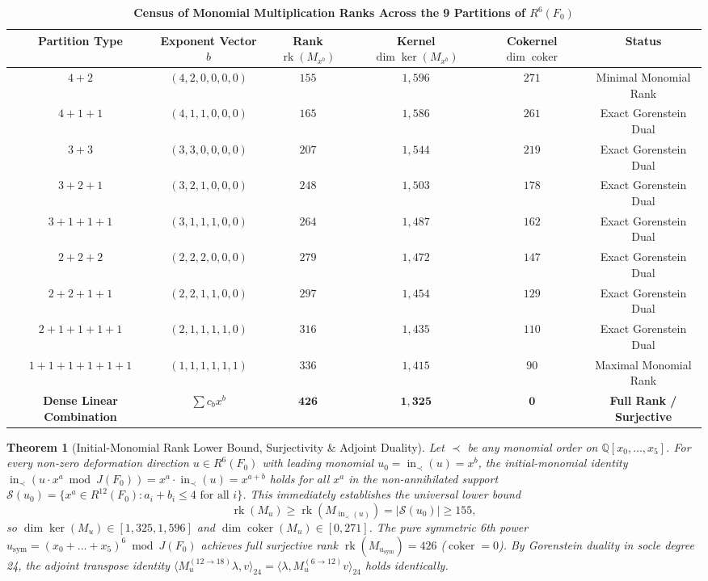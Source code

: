 \documentclass[11pt,a4paper]{article}
\newtheorem{theorem}{Theorem}[section]
\theoremstyle{definition}
\theoremstyle{remark}
\DeclareMathOperator{\rk}{rk}
\DeclareMathOperator{\coker}{coker}
\begin{document}
\begin{table}[htbp]
\centering
\small
\caption{\textbf{Census of Monomial Multiplication Ranks Across the 9 Partitions of $R^6(F_0)$}}
\label{tab:nine_partitions}
\begin{tabular}{cccccc}
\toprule
\textbf{Partition Type} & \textbf{Exponent Vector $b$} & \textbf{Rank $\rk(M_{x^b})$} & \textbf{Kernel $\dim\ker(M_{x^b})$} & \textbf{Cokernel $\dim\coker$} & \textbf{Status} \\
\midrule
$4+2$ & $(4, 2, 0, 0, 0, 0)$ & $155$ & $1,596$ & $271$ & Minimal Monomial Rank \\
$4+1+1$ & $(4, 1, 1, 0, 0, 0)$ & $165$ & $1,586$ & $261$ & Exact Gorenstein Dual \\
$3+3$ & $(3, 3, 0, 0, 0, 0)$ & $207$ & $1,544$ & $219$ & Exact Gorenstein Dual \\
$3+2+1$ & $(3, 2, 1, 0, 0, 0)$ & $248$ & $1,503$ & $178$ & Exact Gorenstein Dual \\
$3+1+1+1$ & $(3, 1, 1, 1, 0, 0)$ & $264$ & $1,487$ & $162$ & Exact Gorenstein Dual \\
$2+2+2$ & $(2, 2, 2, 0, 0, 0)$ & $279$ & $1,472$ & $147$ & Exact Gorenstein Dual \\
$2+2+1+1$ & $(2, 2, 1, 1, 0, 0)$ & $297$ & $1,454$ & $129$ & Exact Gorenstein Dual \\
$2+1+1+1+1$ & $(2, 1, 1, 1, 1, 0)$ & $316$ & $1,435$ & $110$ & Exact Gorenstein Dual \\
$1+1+1+1+1+1$ & $(1, 1, 1, 1, 1, 1)$ & $336$ & $1,415$ & $90$ & Maximal Monomial Rank \\
\midrule
\textbf{Dense Linear Combination} & $\sum c_b x^b$ & $\mathbf{426}$ & $\mathbf{1,325}$ & $\mathbf{0}$ & \textbf{Full Rank / Surjective} \\
\bottomrule
\end{tabular}
\end{table}

\begin{theorem}[Initial-Monomial Rank Lower Bound, Surjectivity \& Adjoint Duality]
\label{thm:initial_monomial_bound}
Let $\prec$ be any monomial order on $\mathbb{Q}[x_0, \dots, x_5]$. For every non-zero deformation direction $u \in R^6(F_0)$ with leading monomial $u_0 = \operatorname{in}_\prec(u) = x^b$, the initial-monomial identity $\operatorname{in}_\prec(u \cdot x^a \bmod J(F_0)) = x^a \cdot \operatorname{in}_\prec(u) = x^{a+b}$ holds for all $x^a$ in the non-annihilated support $\mathcal{S}(u_0) = \{x^a \in R^{12}(F_0) : a_i + b_i \le 4 \text{ for all } i\}$. This immediately establishes the universal lower bound
\begin{equation}
\rk(M_u) \ge \rk(M_{\operatorname{in}_\prec(u)}) = |\mathcal{S}(u_0)| \ge 155,
\end{equation}
so $\dim \ker(M_u) \in [1,325, 1,596]$ and $\dim \coker(M_u) \in [0, 271]$. The pure symmetric 6th power $u_{\mathrm{sym}} = (x_0 + \dots + x_5)^6 \bmod J(F_0)$ achieves full surjective rank $\rk(M_{u_{\mathrm{sym}}}) = 426$ ($\coker = 0$). By Gorenstein duality in socle degree 24, the adjoint transpose identity $\langle M_u^{(12 \to 18)} \lambda, v \rangle_{24} = \langle \lambda, M_u^{(6 \to 12)} v \rangle_{24}$ holds identically.
\end{theorem}
\end{document}
